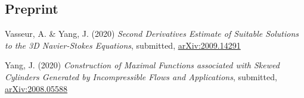 \documentclass[margin,line]{res}
\begin{document}
\begin{resume}






\section{\sc Preprint}

\begin{etaremune}[leftmargin=0.02in, start=2]
    \item Vasseur, A. \& Yang, J. (2020) \textit{Second Derivatives Estimate of Suitable Solutions to the 3D Navier-Stokes Equations}, submitted, \href{https://arxiv.org/abs/2009.14291}{arXiv:2009.14291}
    \item Yang, J. (2020) \textit{Construction of Maximal Functions associated with Skewed Cylinders Generated by Incompressible Flows and Applications}, submitted, \href{https://arxiv.org/abs/2008.05588}{arXiv:2008.05588}
\end{etaremune}






\end{resume}
\end{document}
